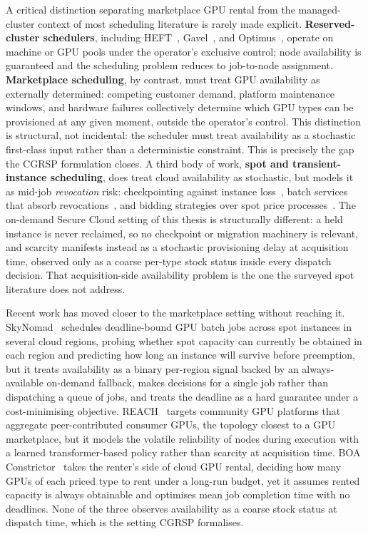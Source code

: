 A critical distinction separating marketplace GPU rental from the managed-cluster context of most scheduling literature is rarely made explicit. \textbf{Reserved-cluster schedulers}, including HEFT~\cite{topcuoglu2002heft}, Gavel~\cite{narayanan2020gavel}, and Optimus~\cite{peng2018optimus}, operate on machine or GPU pools under the operator's exclusive control; node availability is guaranteed and the scheduling problem reduces to job-to-node assignment. \textbf{Marketplace scheduling}, by contrast, must treat GPU availability as externally determined: competing customer demand, platform maintenance windows, and hardware failures collectively determine which GPU types can be provisioned at any given moment, outside the operator's control. This distinction is structural, not incidental: the scheduler must treat availability as a stochastic first-class input rather than a deterministic constraint. This is precisely the gap the CGRSP formulation closes. A third body of work, \textbf{spot and transient-instance scheduling}, does treat cloud availability as stochastic, but models it as mid-job \emph{revocation} risk: checkpointing against instance loss~\cite{yi2010reducing}, batch services that absorb revocations~\cite{subramanya2015spoton}, and bidding strategies over spot price processes~\cite{zheng2015bid}. The on-demand Secure Cloud setting of this thesis is structurally different: a held instance is never reclaimed, so no checkpoint or migration machinery is relevant, and scarcity manifests instead as a stochastic provisioning delay at acquisition time, observed only as a coarse per-type stock status inside every dispatch decision. That acquisition-side availability problem is the one the surveyed spot literature does not address.

Recent work has moved closer to the marketplace setting without reaching it. SkyNomad~\cite{li2026skynomad} schedules deadline-bound GPU batch jobs across spot instances in several cloud regions, probing whether spot capacity can currently be obtained in each region and predicting how long an instance will survive before preemption, but it treats availability as a binary per-region signal backed by an always-available on-demand fallback, makes decisions for a single job rather than dispatching a queue of jobs, and treats the deadline as a hard guarantee under a cost-minimising objective. REACH~\cite{yu2025reach} targets community GPU platforms that aggregate peer-contributed consumer GPUs, the topology closest to a GPU marketplace, but it models the volatile reliability of nodes during execution with a learned transformer-based policy rather than scarcity at acquisition time. BOA Constrictor~\cite{li2026boa} takes the renter's side of cloud GPU rental, deciding how many GPUs of each priced type to rent under a long-run budget, yet it assumes rented capacity is always obtainable and optimises mean job completion time with no deadlines. None of the three observes availability as a coarse stock status at dispatch time, which is the setting CGRSP formalises.

